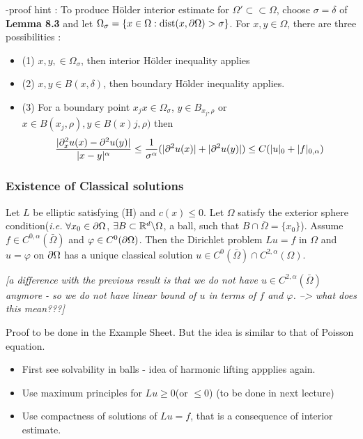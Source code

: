 \documentclass[10pt,a4paper]{article}
\newenvironment{proof}
{\begin{changemargin}{0.5cm}{0.5cm} 
	}%
	{\end{changemargin}
}
\renewenvironment{i}
{\begin{itemize} 
	}%
	{\end{itemize}
}
\begin{document}
-proof hint : To produce H\"older interior estimate for $\Omega' \subset\subset \Omega$, choose $\sigma = \delta$ of \textbf{Lemma 8.3}  and let $\Omega_{\sigma} = \{x\in \Omega : \text{dist}(x, \partial \Omega)>\sigma\}$. For $x, y\in \Omega$, there are three possibilities :
\begin{i}
\item[(1)] $x,y,\in \Omega_{\sigma}$, then interior H\"older inequality applies
\item[(2)] $x,y\in B(x,\delta)$, then boundary H\"older inequality applies.
\item[(3)] For a boundary point $x_j$$x\in \Omega_{\sigma}$, $y\in B_{x_j, \rho}$ or $x\in B(x_j, \rho), y\in B(x)j, \rho)$ then
\begin{align*}
\frac{|\partial_x^2 u(x) - \partial^2_{}u(y)|}{|x-y|^{\alpha}} \leq \frac{1}{\sigma^{\alpha}}(|\partial^2 u(x)|+ |\partial^2 u(y)|) \leq C(|u|_0 + |f|_{0, \alpha})
\end{align*} 
\end{i}



\subsubsection*{Existence of Classical solutions}

\thm Let $L$ be elliptic satisfying (H) and $c(x) \leq 0$. Let $\Omega$ satisfy the exterior sphere condition(\textit{i.e.} $\forall x_0 \in \partial \Omega$, $\exists B \subset \mathbb{R}^d \backslash \Omega$, a ball, such that $B\cap \bar{\Omega} = \{x_0 \}$). Assume $f\in C^{0, \alpha}(\bar{\Omega})$ and $\varphi \in C^0(\partial \Omega)$. Then the Dirichlet problem $Lu =f$ in $\Omega$ and $u= \varphi$ on $\partial \Omega$ has a unique classical solution $u\in C^0(\bar{\Omega}) \cap C^{2, \alpha}(\Omega)$.

\emph{[a difference with the previous result is that we do not have $u \in C^{2, \alpha}(\bar{\Omega})$ anymore - so we do not have linear bound of $u$ in terms of $f$ and $\varphi$. --> what does this mean???]}
\begin{proof}
\pf Proof to be done in the Example Sheet. But the idea is similar to that of Poisson equation.
\begin{i}
\item First see solvability in balls - idea of harmonic lifting appplies again. 
\item Use maximum principles for $Lu \geq 0$(or $\leq 0$) (to be done in next lecture)
\item Use compactness of solutions of $Lu =f$, that is a consequence of interior estimate.
\end{i} 
\end{proof}
\s
\end{document}
